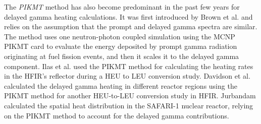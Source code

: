 \documentclass{style/nseJournal}
\begin{document}

The \textit{PIKMT} method has also become predominant in the past few years for delayed gamma heating calculations.
It was first introduced by Brown et al. \cite{brown_monte_2008} and relies on the assumption that the prompt and delayed gamma spectra are similar.
The method uses one neutron-photon coupled simulation using the MCNP PIKMT card to evaluate the energy deposited by prompt gamma radiation originating at fuel fission events, and then it scales it to the delayed gamma component.
Ilas et al. \cite{ilas_impact_2013} used the PIKMT method for calculating the heating rates in the \gls*{HFIR}’s reflector during a \gls*{HEU} to \gls*{LEU} conversion study.
Davidson et al. \cite{davidson_heat_2017} calculated the delayed gamma heating in different reactor regions using the PIKMT method for another HEU-to-LEU conversion study in HFIR.
Jurbandam \cite{jurbandam_calculation_2018} calculated the spatial heat distribution in the SAFARI-1 nuclear reactor, relying on the PIKMT method to account for the delayed gamma contributions.
\end{document}
